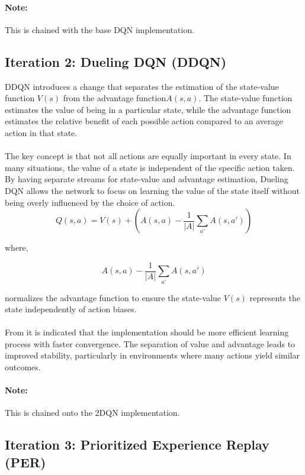 \documentclass[
12pt, %
oneside, %
english, %
onehalfspacing, %
nolistspacing, %
liststotoc, %
headsepline, %
]{ProposalAndThesis} %
\begin{document}
\paragraph{Note:} This is chained with the base DQN implementation.

\subsection{Iteration 2: Dueling DQN (DDQN)}

DDQN \parencite{wang_dueling_2016} introduces a change that separates the estimation of the state-value function \(V(s)\) from the advantage function\(A(s,a)\). The state-value function estimates the value of being in a particular state, while the advantage function estimates the relative benefit of each possible action compared to an average action in that state.
\\\\
\noindent The key concept is that not all actions are equally important in every state. In many situations, the value of a state is independent of the specific action taken. By having separate streams for state-value and advantage estimation, Dueling DQN allows the network to focus on learning the value of the state itself without being overly influenced by the choice of action.
\[Q(s,a)=V(s) + (A(s,a) - \frac{1}{|A|}\sum_{a'}A(s,a'))\]

where,

\[A(s,a) - \frac{1}{|A|}\sum_{a'}A(s,a')\]

normalizes the advantage function to ensure the state-value \(V(s)\) represents the state independently of action biases.
\\\\
\noindent From \parencite{wang_dueling_2016} it is indicated that the implementation should be more efficient learning process with faster convergence. The separation of value and advantage leads to improved stability, particularly in environments where many actions yield similar outcomes.

\paragraph{Note:} This is chained onto the 2DQN implementation.

\subsection{Iteration 3: Prioritized Experience Replay (PER)}
\end{document}
